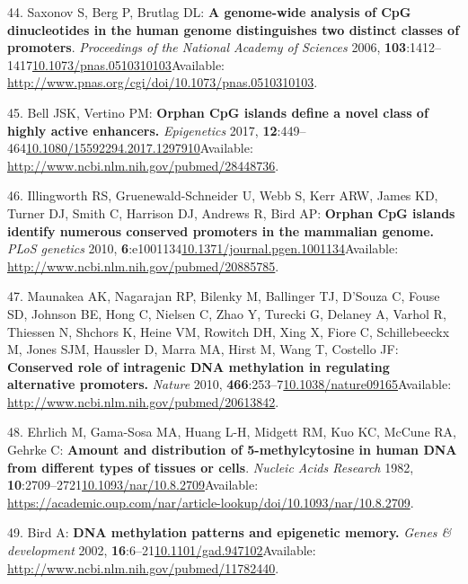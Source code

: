 \documentclass[
]{book}
\begin{document}
\leavevmode\hypertarget{ref-Saxonov2006}{}%
44. Saxonov S, Berg P, Brutlag DL: \textbf{A genome-wide analysis of CpG dinucleotides in the human genome distinguishes two distinct classes of promoters}. \emph{Proceedings of the National Academy of Sciences} 2006, \textbf{103}:1412--1417\href{https://doi.org/10.1073/pnas.0510310103}{10.1073/pnas.0510310103}Available: \url{http://www.pnas.org/cgi/doi/10.1073/pnas.0510310103}.

\leavevmode\hypertarget{ref-Bell2017}{}%
45. Bell JSK, Vertino PM: \textbf{Orphan CpG islands define a novel class of highly active enhancers.} \emph{Epigenetics} 2017, \textbf{12}:449--464\href{https://doi.org/10.1080/15592294.2017.1297910}{10.1080/15592294.2017.1297910}Available: \url{http://www.ncbi.nlm.nih.gov/pubmed/28448736}.

\leavevmode\hypertarget{ref-Illingworth2010}{}%
46. Illingworth RS, Gruenewald-Schneider U, Webb S, Kerr ARW, James KD, Turner DJ, Smith C, Harrison DJ, Andrews R, Bird AP: \textbf{Orphan CpG islands identify numerous conserved promoters in the mammalian genome.} \emph{PLoS genetics} 2010, \textbf{6}:e1001134\href{https://doi.org/10.1371/journal.pgen.1001134}{10.1371/journal.pgen.1001134}Available: \url{http://www.ncbi.nlm.nih.gov/pubmed/20885785}.

\leavevmode\hypertarget{ref-Maunakea2010}{}%
47. Maunakea AK, Nagarajan RP, Bilenky M, Ballinger TJ, D'Souza C, Fouse SD, Johnson BE, Hong C, Nielsen C, Zhao Y, Turecki G, Delaney A, Varhol R, Thiessen N, Shchors K, Heine VM, Rowitch DH, Xing X, Fiore C, Schillebeeckx M, Jones SJM, Haussler D, Marra MA, Hirst M, Wang T, Costello JF: \textbf{Conserved role of intragenic DNA methylation in regulating alternative promoters.} \emph{Nature} 2010, \textbf{466}:253--7\href{https://doi.org/10.1038/nature09165}{10.1038/nature09165}Available: \url{http://www.ncbi.nlm.nih.gov/pubmed/20613842}.

\leavevmode\hypertarget{ref-Ehrlich1982}{}%
48. Ehrlich M, Gama-Sosa MA, Huang L-H, Midgett RM, Kuo KC, McCune RA, Gehrke C: \textbf{Amount and distribution of 5-methylcytosine in human DNA from different types of tissues or cells}. \emph{Nucleic Acids Research} 1982, \textbf{10}:2709--2721\href{https://doi.org/10.1093/nar/10.8.2709}{10.1093/nar/10.8.2709}Available: \url{https://academic.oup.com/nar/article-lookup/doi/10.1093/nar/10.8.2709}.

\leavevmode\hypertarget{ref-Bird2002}{}%
49. Bird A: \textbf{DNA methylation patterns and epigenetic memory.} \emph{Genes \& development} 2002, \textbf{16}:6--21\href{https://doi.org/10.1101/gad.947102}{10.1101/gad.947102}Available: \url{http://www.ncbi.nlm.nih.gov/pubmed/11782440}.
\end{document}
